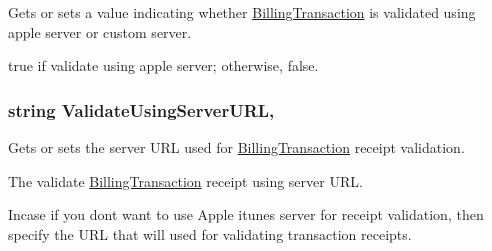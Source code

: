 Gets or sets a value indicating whether \hyperlink{class_voxel_busters_1_1_native_plugins_1_1_billing_transaction}{Billing\+Transaction} is validated using apple server or custom server. 

{\ttfamily true} if validate using apple server; otherwise, {\ttfamily false}.\hypertarget{class_voxel_busters_1_1_native_plugins_1_1_billing_settings_1_1i_o_s_settings_ab08555b9531853cae78f724a1967a09b}{}
\subsubsection[{Validate\+Using\+Server\+U\+R\+L}]{\setlength{\rightskip}{0pt plus 5cm}string Validate\+Using\+Server\+U\+R\+L\hspace{0.3cm}{\ttfamily [get]}, {\ttfamily [set]}}\label{class_voxel_busters_1_1_native_plugins_1_1_billing_settings_1_1i_o_s_settings_ab08555b9531853cae78f724a1967a09b}


Gets or sets the server U\+R\+L used for \hyperlink{class_voxel_busters_1_1_native_plugins_1_1_billing_transaction}{Billing\+Transaction} receipt validation. 

The validate \hyperlink{class_voxel_busters_1_1_native_plugins_1_1_billing_transaction}{Billing\+Transaction} receipt using server U\+R\+L.

Incase if you dont want to use Apple itunes server for receipt validation, then specify the U\+R\+L that will used for validating transaction receipts.  